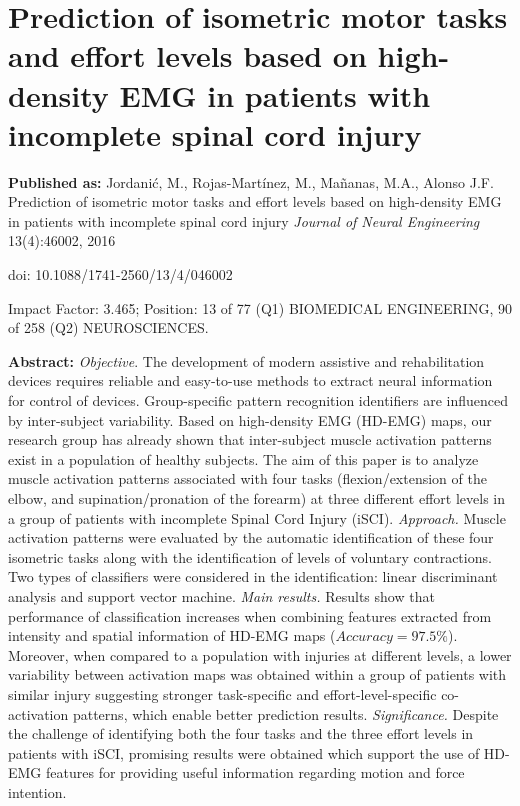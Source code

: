 \chapter[Myoelectric patterns within the group of patients with iSCI]{Prediction of isometric motor tasks and effort levels based on high-density EMG in patients with incomplete spinal cord injury}
\label{ch:p2}
\textbf{Published as:} 
Jordanić, M., Rojas-Martínez, M., Ma\~nanas, M.A., Alonso J.F.
Prediction of isometric motor tasks and effort levels based on high-density EMG in patients with incomplete spinal cord injury \textit{Journal of Neural Engineering} 13(4):46002, 2016

doi: 10.1088/1741-2560/13/4/046002

Impact Factor: 3.465; Position: 13 of 77 (Q1) BIOMEDICAL ENGINEERING, 90 of 258 (Q2) NEUROSCIENCES.


\textbf{Abstract:} \textit{Objective}. The development of modern assistive and rehabilitation devices requires reliable and easy-to-use methods to extract neural information for control of devices. Group-specific pattern recognition identifiers are influenced by inter-subject variability. Based on high-density EMG (HD-EMG) maps, our research group has already shown that inter-subject muscle activation patterns exist in a population of healthy subjects. The aim of this paper is to analyze muscle activation patterns associated with four tasks (flexion/extension of the elbow, and supination/pronation of the forearm) at three different effort levels in a group of patients with incomplete Spinal Cord Injury (iSCI). \textit{Approach.} Muscle activation patterns were evaluated by the automatic identification of these four isometric tasks along with the identification of levels of voluntary contractions. Two types of classifiers were considered in the identification: linear discriminant analysis and support vector machine. \textit{Main results.} Results show that performance of classification increases when combining features extracted from intensity and spatial information of HD-EMG maps ($Accuracy = 97.5\%$). Moreover, when compared to a population with injuries at different levels, a lower variability between activation maps was obtained within a group of patients with similar injury suggesting stronger task-specific and effort-level-specific co-activation patterns, which enable better prediction results. \textit{Significance.} Despite the challenge of identifying both the four tasks and the three effort levels in patients with iSCI, promising results were obtained which support the use of HD-EMG features for providing useful information regarding motion and force intention.

